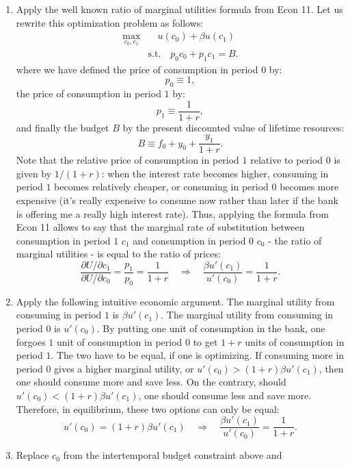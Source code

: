 \documentclass[]{book}
\theoremstyle{definition}
\theoremstyle{definition}
\theoremstyle{definition}
\theoremstyle{remark}
\begin{document}
\begin{enumerate}
\def\labelenumi{\arabic{enumi}.}
\item
  Apply the well known ratio of marginal utilities formula from Econ 11.
  Let us rewrite this optimization problem as follows: \[
  \begin{aligned} 
  \max_{c_{0},c_{1}} & \quad u(c_{0})+\beta u(c_{1}) \\
  & \text{s.t.} \quad p_0c_{0}+p_1 c_1=B.
  \end{aligned}
  \] where we have defined the price of consumption in period \(0\) by:
  \[p_0 \equiv 1,\] the price of consumption in period \(1\) by:
  \[p_1 \equiv \frac{1}{1+r},\] and finally the budget \(B\) by the
  present discounted value of lifetime resources:
  \[B \equiv f_{0}+y_{0}+\frac{y_{1}}{1+r}.\] Note that the relative
  price of consumption in period \(1\) relative to period \(0\) is given
  by \(1/(1+r)\): when the interest rate becomes higher, consuming in
  period \(1\) becomes relatively cheaper, or consuming in period \(0\)
  becomes more expensive (it's really expensive to consume now rather
  than later if the bank is offering me a really high interest rate).
  Thus, applying the formula from Econ 11 allows to say that the
  marginal rate of substitution between consumption in period \(1\)
  \(c_1\) and consumption in period \(0\) \(c_0\) - the ratio of
  marginal utilities - is equal to the ratio of prices:
  \[\frac{\partial U / \partial c_1}{\partial U / \partial c_0} = \frac{p_1}{p_0}= \frac{1}{1+r} \quad\Rightarrow\quad \boxed{\frac{\beta u'(c_{1})}{u'(c_{0})}=\frac{1}{1+r}}.\]
\item
  Apply the following intuitive economic argument. The marginal utility
  from consuming in period \(1\) is \(\beta u'(c_{1})\). The marginal
  utility from consuming in period \(0\) is \(u'(c_{0})\). By putting
  one unit of consumption in the bank, one forgoes \(1\) unit of
  consumption in period \(0\) to get \(1+r\) units of consumption in
  period \(1\). The two have to be equal, if one is optimizing. If
  consuming more in period \(0\) gives a higher marginal utility, or
  \(u'(c_{0})>(1+r)\beta u'(c_{1})\), then one should consume more and
  save less. On the contrary, should \(u'(c_{0})<(1+r)\beta u'(c_{1})\),
  one should consume less and save more. Therefore, in equilibrium,
  these two options can only be equal:
  \[u'(c_{0})=(1+r)\beta u'(c_{1})\quad\Rightarrow\quad \boxed{\frac{\beta u'(c_{1})}{u'(c_{0})}=\frac{1}{1+r}}.\]
\item
  Replace \(c_{0}\) from the intertemporal budget constraint above and

\end{enumerate}
\end{document}
